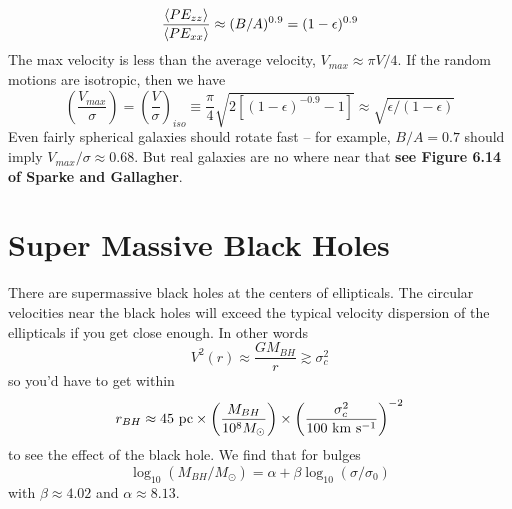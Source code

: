 \documentclass[]{article}
\begin{document}
\begin{equation}
\frac{\langle PE_{zz}\rangle}{\langle PE_{xx}\rangle} \approx (B/A)^{0.9} = (1-\epsilon)^{0.9}
\end{equation}
\noindent
The max velocity is less than the average velocity, $V_{max}\approx\pi V/4$.
If the random motions are isotropic, then we have
\begin{equation}
\left(\frac{V_{max}}{\sigma}\right) =\left(\frac{V}{\sigma}\right)_{iso} \equiv \frac{\pi}{4}\sqrt{2[(1-\epsilon)^{-0.9} -1]} \approx \sqrt{\epsilon/(1-\epsilon)}
\end{equation}
\noindent
Even fairly spherical galaxies should rotate fast -- for example, $B/A=0.7$ should imply $V_{max}/\sigma\approx0.68$. But real galaxies are no where near that {\bf see Figure 6.14 of Sparke and Gallagher}.

\section{Super Massive Black Holes}
There are supermassive black holes at the centers of ellipticals. The
circular velocities near the black holes will exceed the typical velocity 
dispersion of the ellipticals if you get close enough.  In other words
\begin{equation}
V^2(r) \approx \frac{GM_{BH}}{r} \gtrsim \sigma_c^2
\end{equation}
\noindent
so you'd have to get within
\begin{equation}
r_{BH} \approx 45~\mathrm{pc} \times \left(\frac{M_{BH}}{10^8M_{\odot}}\right) \times \left(\frac{\sigma_c^2}{100~\mathrm{km}~\mathrm{s}^{-1}}\right)^{-2}
\end{equation}
\noindent
to see the effect of the black hole.  
We find that for bulges
\begin{equation}
\log_{10}\left(M_{BH}/M_{\odot}\right) = \alpha + \beta \log_{10} (\sigma/\sigma_0)
\end{equation}
\noindent
with $\beta\approx4.02$ and $\alpha\approx8.13$.
\end{document}
